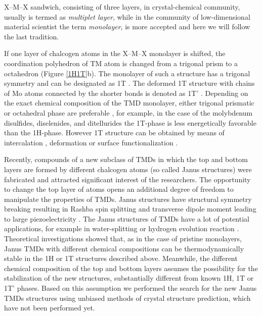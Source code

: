 \documentclass[a4paperm]{article}
\begin{document}
X--M--X sandwich, consisting of three layers, in crystal-chemical community, usually is termed as {\it multiplet layer}, while in the community of low-dimensional material scientist the term {\it monolayer}, is more accepted and here we will follow the last tradition. 


If one layer of chalcogen atoms in the X--M--X monolayer is shifted, the coordination polyhedron of TM atom is changed from a trigonal prism to a octahedron (Figure \ref{1H1T}b). 
The monolayer of such a structure has a trigonal symmetry and can be designated as 1T \cite{huang2020recent}. 
The deformed 1T structure with chains of Mo atoms connected by the shorter bonds is denoted as 1T' \cite{huang2020recent}.
Depending on the exact chemical composition of the TMD monolayer, either trigonal prismatic or octahedral phase are preferable \cite{ataca2012stable}, for example, in the case of the molybdenum disulfides, diselenides, and ditellurides the 1T-phase is less energetically favorable than the 1H-phase. However 1T structure can be obtained by means of intercalation \cite{kan2014structures, wang2014atomic}, deformation \cite{duerloo2014structural} or surface functionalization \cite{tang2015stabilization, voiry2015covalent}. 

Recently, compounds of a new subclass of TMDs in which the top and bottom layers are formed by different chalcogen atoms (so called Janus structures) were fabricated and attracted significant interest \cite{lu2017, zhang2017janus} of the researchers. 
The opportunity to change the top layer of atoms opens an additional degree of freedom to manipulate the properties of TMDs. 
Janus structures have structural symmetry breaking \cite{li2017electronic, van2020first} resulting in Rashba spin splitting \cite{hu2018intrinsic} and transverse dipole moment leading to large piezoelectricity \cite{dong2017large, li2018recent}. 
The Janus structures of TMDs have a lot of potential applications, for example in water-splitting \cite{xia2018universality, ma2018janus} or hydrogen evolution reaction \cite{er2018prediction, zhou2019janus}. 
Theoretical investigations showed that, as in the case of pristine monolayers, Janus TMDs with different chemical compositions can be thermodynamically stable in the 1H or 1T structures described above.
Meanwhile, the different chemical composition of the top and bottom layers assumes the possibility for the stabilization of the new structures, substantially different from known 1H, 1T or 1T' phases.
Based on this assumption we performed the search for the new Janus TMDs structures using unbiased methods of crystal structure prediction, which have not been performed yet.
\end{document}
